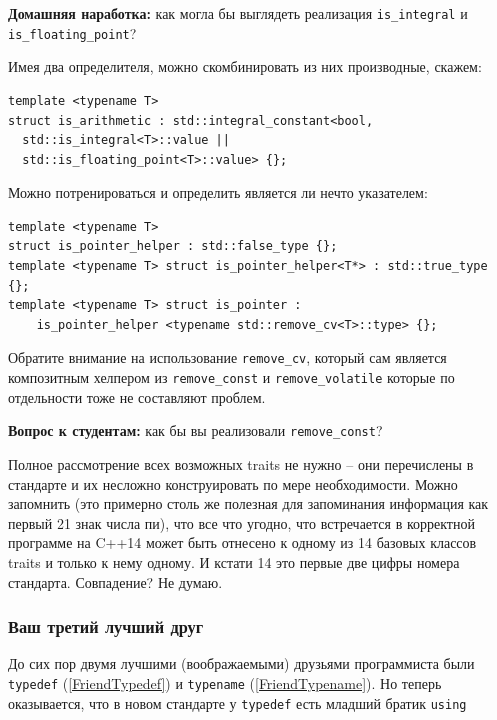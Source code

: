 \documentclass[a4paper,12pt,oneside]{article}
\newif\ifanswers
\begin{document}
\textbf{Домашняя наработка:} как могла бы выглядеть реализация \lstinline!is_integral! и \lstinline!is_floating_point!?

Имея два определителя, можно скомбинировать из них производные, скажем:

\begin{lstlisting}
template <typename T>
struct is_arithmetic : std::integral_constant<bool,
  std::is_integral<T>::value ||
  std::is_floating_point<T>::value> {};
\end{lstlisting}

Можно потренироваться и определить является ли нечто указателем:

\begin{lstlisting}
template <typename T> 
struct is_pointer_helper : std::false_type {};
template <typename T> struct is_pointer_helper<T*> : std::true_type {};
template <typename T> struct is_pointer : 
    is_pointer_helper <typename std::remove_cv<T>::type> {};
\end{lstlisting}

Обратите внимание на использование \lstinline!remove_cv!, который сам является композитным хелпером из \lstinline!remove_const! и \lstinline!remove_volatile! которые по отдельности тоже не составляют проблем.

\textbf{Вопрос к студентам:} как бы вы реализовали \lstinline!remove_const!? 

\ifanswers
Правильный ответ:

\begin{lstlisting}
template <typename T> 
struct remove_const { typedef T type; };
template <typename T> 
struct remove_const<const T> { typedef T type; };
\end{lstlisting}
\fi

Полное рассмотрение всех возможных traits не нужно -- они перечислены в стандарте и их несложно конструировать по мере необходимости. Можно запомнить (это примерно столь же полезная для запоминания информация как первый 21 знак числа пи), что все что угодно, что встречается в корректной программе на C++14 может быть отнесено к одному из 14 базовых классов traits и только к нему одному. И кстати 14 это первые две цифры номера стандарта. Совпадение? Не думаю.

\subsubsection{Ваш третий лучший друг}\label{FriendUsing}

До сих пор двумя лучшими (воображаемыми) друзьями программиста были \lstinline!typedef! (\ref{FriendTypedef}) и \lstinline!typename! (\ref{FriendTypename}). Но теперь оказывается, что в новом стандарте у \lstinline!typedef! есть младший братик \lstinline!using!
\end{document}
